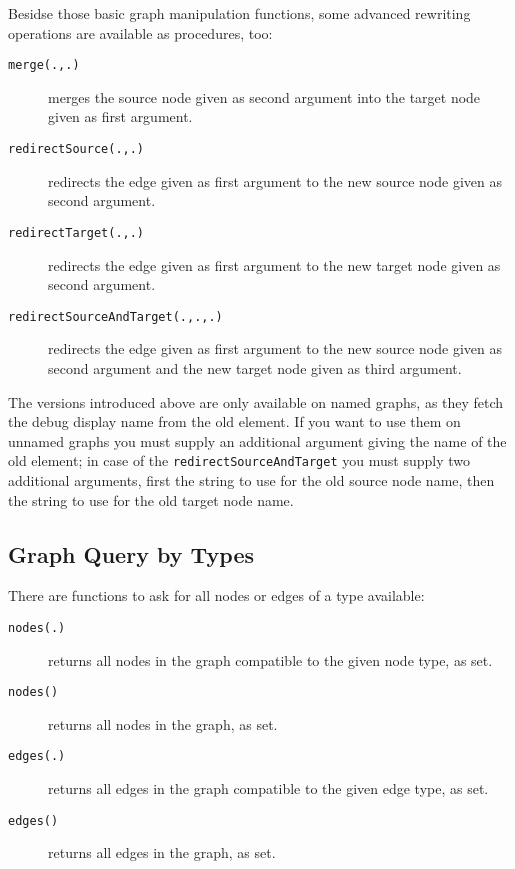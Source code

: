 \noindent Besidse those basic graph manipulation functions, some advanced rewriting operations are available as procedures, too:

\begin{description}
\item[\texttt{merge(.,.)}] merges the source node given as second argument into the target node given as first argument.
\item[\texttt{redirectSource(.,.)}] redirects the edge given as first argument to the new source node given as second argument.
\item[\texttt{redirectTarget(.,.)}] redirects the edge given as first argument to the new target node given as second argument.
\item[\texttt{redirectSourceAndTarget(.,.,.)}] redirects the edge given as first argument to the new source node given as second argument and the new target node given as third argument.
\end{description}

The versions introduced above are only available on named graphs, as they fetch the debug display name from the old element.
If you want to use them on unnamed graphs you must supply an additional argument giving the name of the old element; in case of the \texttt{redirectSourceAndTarget} you must supply two additional arguments, first the string to use for the old source node name, then the string to use for the old target node name.

\subsection{Graph Query by Types}

There are functions to ask for all nodes or edges of a type available: 
\begin{description}
\item[\texttt{nodes(.)}] returns all nodes in the graph compatible to the given node type, as set.
\item[\texttt{nodes()}] returns all nodes in the graph, as set.
\item[\texttt{edges(.)}] returns all edges in the graph compatible to the given edge type, as set.
\item[\texttt{edges()}] returns all edges in the graph, as set.
\end{description}


